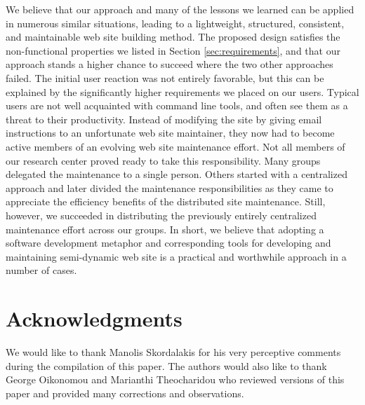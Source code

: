 \documentclass{article}
\begin{document}
We believe that our approach and many of the lessons we learned
can be applied in numerous similar situations,
leading to a lightweight, structured, consistent, and maintainable
web site building method. The proposed design satisfies the non-functional properties
we listed in Section \ref{sec:requirements},
and that our approach stands a higher chance to succeed where the
two other approaches failed.
The initial user reaction was not entirely favorable, but this can
be explained by the significantly higher requirements we
placed on our users. Typical users are not well acquainted
with command line tools, and often see them as a threat to their productivity.
Instead of modifying the site by giving email instructions to an unfortunate
web site maintainer, they now had to become active members
of an evolving web site maintenance effort.
Not all members of our research center proved ready to take
this responsibility.
Many groups delegated the maintenance to a single person. 
Others started with a centralized approach and later divided the
maintenance responsibilities as they came to appreciate the efficiency
benefits of the distributed site maintenance.
Still, however, we succeeded in distributing the previously
entirely centralized maintenance effort across our groups.
In short, we believe that adopting a software development
metaphor and corresponding tools for developing and maintaining semi-dynamic
web site is a practical and worthwhile approach in a number of cases.

\section{Acknowledgments}
\label{sec:ack}

We would like to thank Manolis Skordalakis for his very perceptive comments during the compilation of this paper.
The authors would also like to thank George Oikonomou and Marianthi Theocharidou who reviewed versions 
of this paper and provided many corrections and observations.



\end{document}
